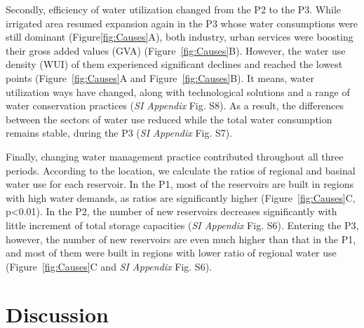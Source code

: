 \documentclass[9pt, twocolumn, twoside, lineno]{pnas-new}
\begin{document}
Secondly, efficiency of water utilization changed from the P2 to the P3.
While irrigated area resumed expansion again in the P3 whose water consumptions were still dominant (Figure\ref{fig:Causes}A), both industry, urban services were boosting their gross added values (GVA) (Figure~\ref{fig:Causes}B). 
However, the water use density (WUI) of them experienced significant declines and reached the lowest points (Figure~\ref{fig:Causes}A and Figure~\ref{fig:Causes}B).
It means, water utilization ways  have changed, along with technological solutions and a range of water conservation practices (\textit{SI Appendix} Fig. S8). As a result, the differences between the sectors of water use reduced while the total water consumption remains stable, during the P3 (\textit{SI Appendix} Fig. S7).

Finally, changing water management practice contributed throughout all three periods. 
According to the location, we calculate the ratios of regional and basinal water use for each reservoir.
In the P1, most of the reservoirs are built in regions with high water demands, as ratios are significantly higher (Figure~\ref{fig:Causes}C, p<0.01). 
In the P2, the number of new reservoirs decreases significantly with little increment of total storage capacities (\textit{SI Appendix} Fig. S6). 
Entering the P3, however, the number of new reservoirs are even much higher than that in the P1, and most of them were built in regions with lower ratio of regional water use (Figure~\ref{fig:Causes}C and \textit{SI Appendix} Fig. S6).

\section*{Discussion}
\end{document}
